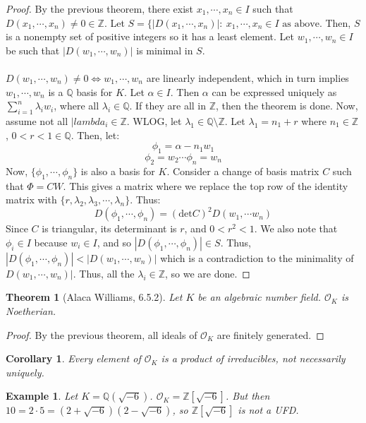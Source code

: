 \documentclass{article}
\newcommand{\air}{\mathcal{O}_K}
\newcommand{\Q}{\mathbb{Q}}
\newcommand{\Z}{\mathbb{Z}}
\newtheorem{theorem}{Theorem}[subsection]
\newtheorem{cor}{Corollary}[subsection]
\newtheorem{example}{Example}[subsection]
\begin{document}
      \begin{proof}
      By the previous theorem, there exist $x_1,\cdots, x_n\in I$ such that $D(x_1,\cdots, x_n)\neq 0\in \Z$. Let $S=\{|D(x_1,\cdots, x_n)|:\ x_1,\cdots, x_n\in I\text{ as above}$. Then, $S$ is a nonempty set of positive integers so it has a least element. Let $w_1,\cdots, w_n\in I$ be such that $|D(w_1,\cdots, w_n)|$ is minimal in $S$. \\
      \\
      $D(w_1,\cdots, w_n)\neq 0 \iff w_1,\cdots, w_n$ are linearly independent, which in turn implies $w_1,\cdots, w_n$ is a $\Q$ basis for $K$. Let $\alpha \in I$. Then $\alpha$ can be expressed uniquely as $\displaystyle\sum_{i=1}^n\lambda_iw_i$, where all $\lambda_i\in\Q$. If they are all in $\Z$, then the theorem is done. Now, assume not all $|lambda_i\in \Z$. WLOG, let $\lambda_1\in \Q\setminus \Z$. Let $\lambda_1=n_1+r$ where $n_1\in \Z$, $0<r<1\in \Q$. Then, let:
      $$\phi_1 = \alpha - n_1w_1$$
      $$\phi_2=w_2\cdots \phi_n= w_n$$
      Now, $\{\phi_1,\cdots, \phi_n\}$ is also a basis for $K$. Consider a change of basis matrix $C$ such that $\Phi = CW$. This gives a matrix where we replace the top row of the identity matrix with $\{r,\lambda_2,\lambda_3,\cdots, \lambda_n\}$. Thus:
      $$D(\phi_1,\cdots, \phi_n) = (\text{det} C)^2 D(w_1,\cdots w_n)$$
      Since $C$ is triangular, its determinant is $r$, and $0<r^2<1$. We also note that $\phi_i\in I$ because $w_i\in I$, and so $|D(\phi_1,\cdots, \phi_n)|\in S$. Thus, $|D(\phi_1,\cdots, \phi_n)|<|D(w_1,\cdots, w_n)|$ which is a contradiction to the minimality of $D(w_1,\cdots, w_n)|$. Thus, all the $\lambda_i\in \Z$, so we are done.
      \end{proof}
      \begin{theorem}[Alaca Williams, 6.5.2]
      Let $K$ be an algebraic number field. $\air$ is Noetherian. 
      \end{theorem}
      \begin{proof}
      By the previous theorem, all ideals of $\air$ are finitely generated.
      \end{proof}
      \begin{cor}
      Every element of $\air$ is a product of irreducibles, not necessarily uniquely.
      \end{cor}
      \begin{example}
      Let $K=\Q(\sqrt{-6})$. $\air=\Z[\sqrt{-6}]$. But then $10=2\cdot 5= (2+\sqrt{-6})(2-\sqrt{-6})$, so $\Z[\sqrt{-6}]$ is not a UFD. 
      \end{example}
\end{document}

